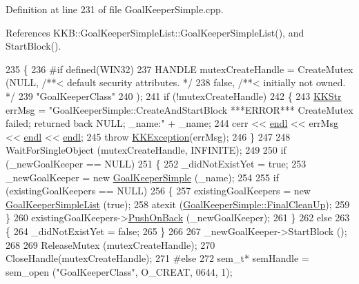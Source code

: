 Definition at line 231 of file Goal\+Keeper\+Simple.\+cpp.



References K\+K\+B\+::\+Goal\+Keeper\+Simple\+List\+::\+Goal\+Keeper\+Simple\+List(), and Start\+Block().


\begin{DoxyCode}
235 \{
236 \textcolor{preprocessor}{#if  defined(WIN32)}
237   HANDLE  mutexCreateHandle = CreateMutex (NULL,                 \textcolor{comment}{/**< default security attributes. */}
238                                            \textcolor{keyword}{false},                \textcolor{comment}{/**< initially not owned.         */}
239                                            \textcolor{stringliteral}{"GoalKeeperClass"}
240                                           ); 
241   \textcolor{keywordflow}{if}  (!mutexCreateHandle)
242   \{
243     \hyperlink{class_k_k_b_1_1_k_k_str}{KKStr} errMsg = \textcolor{stringliteral}{"GoalKeeperSimple::CreateAndStartBlock   ***ERROR***   CreateMutex failed; returned
       back NULL;  \_name:"} + \_name;
244     cerr << \hyperlink{namespace_k_k_b_ad1f50f65af6adc8fa9e6f62d007818a8}{endl} << errMsg << \hyperlink{namespace_k_k_b_ad1f50f65af6adc8fa9e6f62d007818a8}{endl} << \hyperlink{namespace_k_k_b_ad1f50f65af6adc8fa9e6f62d007818a8}{endl};
245     \textcolor{keywordflow}{throw} \hyperlink{class_k_k_b_1_1_k_k_exception}{KKException}(errMsg);
246   \}
247 
248   WaitForSingleObject (mutexCreateHandle, INFINITE);
249 
250   \textcolor{keywordflow}{if}  (\_newGoalKeeper == NULL)
251   \{
252     \_didNotExistYet = \textcolor{keyword}{true};
253     \_newGoalKeeper = \textcolor{keyword}{new} \hyperlink{class_k_k_b_1_1_goal_keeper_simple}{GoalKeeperSimple} (\_name);
254 
255     \textcolor{keywordflow}{if}  (existingGoalKeepers == NULL)
256     \{
257       existingGoalKeepers = \textcolor{keyword}{new} \hyperlink{class_k_k_b_1_1_goal_keeper_simple_list}{GoalKeeperSimpleList} (\textcolor{keyword}{true});
258       atexit (\hyperlink{class_k_k_b_1_1_goal_keeper_simple_a8b38fb338438be5de8e2aaa2ac3b227d}{GoalKeeperSimple::FinalCleanUp});
259     \}
260     existingGoalKeepers->\hyperlink{class_k_k_b_1_1_k_k_queue_aa9fba4632b54268bf71ecb42dee0b575}{PushOnBack} (\_newGoalKeeper);
261   \}
262   \textcolor{keywordflow}{else}
263   \{
264     \_didNotExistYet = \textcolor{keyword}{false};
265   \}
266 
267   \_newGoalKeeper->StartBlock ();
268 
269   ReleaseMutex (mutexCreateHandle);
270   CloseHandle(mutexCreateHandle);
271 \textcolor{preprocessor}{#else}
272   sem\_t*  semHandle = sem\_open (\textcolor{stringliteral}{"GoalKeeperClass"}, O\_CREAT, 0644, 1);

\end{DoxyCode}
